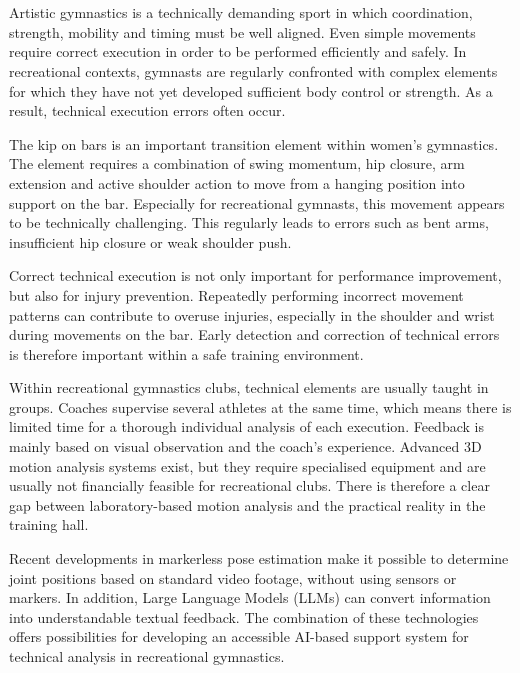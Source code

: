 \chapter{}%
\label{ch:inleiding}

Artistic gymnastics is a technically demanding sport in which coordination, strength, mobility and timing must be well aligned. Even simple movements require correct execution in order to be performed efficiently and safely. In recreational contexts, gymnasts are regularly confronted with complex elements for which they have not yet developed sufficient body control or strength. As a result, technical execution errors often occur.

The kip on bars is an important transition element within women's gymnastics. The element requires a combination of swing momentum, hip closure, arm extension and active shoulder action to move from a hanging position into support on the bar. Especially for recreational gymnasts, this movement appears to be technically challenging. This regularly leads to errors such as bent arms, insufficient hip closure or weak shoulder push.

Correct technical execution is not only important for performance improvement, but also for injury prevention. Repeatedly performing incorrect movement patterns can contribute to overuse injuries, especially in the shoulder and wrist during movements on the bar. Early detection and correction of technical errors is therefore important within a safe training environment.

Within recreational gymnastics clubs, technical elements are usually taught in groups. Coaches supervise several athletes at the same time, which means there is limited time for a thorough individual analysis of each execution. Feedback is mainly based on visual observation and the coach's experience. Advanced 3D motion analysis systems exist, but they require specialised equipment and are usually not financially feasible for recreational clubs. There is therefore a clear gap between laboratory-based motion analysis and the practical reality in the training hall.

Recent developments in markerless pose estimation make it possible to determine joint positions based on standard video footage, without using sensors or markers. In addition, Large Language Models (LLMs) can convert information into understandable textual feedback. The combination of these technologies offers possibilities for developing an accessible AI-based support system for technical analysis in recreational gymnastics.

